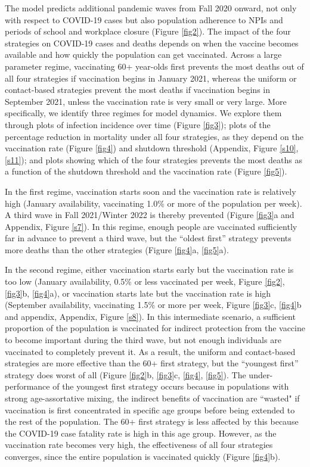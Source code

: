 The model predicts additional pandemic waves from Fall 2020 onward, not only with respect to COVID-19 cases but also population adherence to NPIs and periods of school and workplace closure (Figure \ref{fig2}). The impact of the four strategies on COVID-19 cases and deaths depends on when the vaccine becomes available and how quickly the population can get vaccinated. Across a large parameter regime, vaccinating 60+ year-olds first prevents the most deaths out of all four strategies if vaccination begins in January 2021, whereas the uniform or contact-based strategies prevent the most deaths if vaccination begins in September 2021, unless the vaccination rate is very small or very large. More specifically, we identify three regimes for model dynamics. We explore them through plots of infection incidence over time (Figure \ref{fig3}); plots of the percentage reduction in mortality under all four strategies, as they depend on the vaccination rate (Figure \ref{fig4}) and shutdown threshold (Appendix, Figure \ref{s10}, \ref{s11}); and plots showing which of the four strategies prevents the most deaths as a function of the shutdown threshold and the vaccination rate (Figure \ref{fig5}). 

In the first regime, vaccination starts soon and the vaccination rate is relatively high (January availability, vaccinating 1.0\% or more of the population per week). A third wave in Fall 2021/Winter 2022 is thereby prevented (Figure \ref{fig3}a and Appendix, Figure \ref{s7}).  In this regime, enough people are vaccinated sufficiently far in advance to prevent a third wave, but the “oldest first” strategy prevents more deaths than the other strategies (Figure \ref{fig4}a, \ref{fig5}a). 

In the second regime, either vaccination starts early but the vaccination rate is too low (January availability, 0.5\% or less vaccinated per week, Figure \ref{fig2}, \ref{fig3}b, \ref{fig4}a), or vaccination starts late but the vaccination rate is high (September availability, vaccinating 1.5\% or more per week, Figure \ref{fig3}c, \ref{fig4}b and appendix, Appendix, Figure \ref{s8}).  In this intermediate scenario, a sufficient proportion of the population is vaccinated for indirect protection from the vaccine to become important during the third wave, but not enough individuals are vaccinated to completely prevent it.  As a result, the uniform and contact-based strategies are more effective than the 60+ first strategy, but the “youngest first” strategy does worst of all (Figure \ref{fig2}b, \ref{fig3}c, \ref{fig4}, \ref{fig5}).  The under-performance of the youngest first strategy occurs because in populations with strong age-assortative mixing, the indirect benefits of vaccination are “wasted" if vaccination is first concentrated in specific age groups before being extended to the rest of the population.  The 60+ first strategy is less affected by this because the COVID-19 case fatality rate is high in this age group. However, as the vaccination rate becomes very high, the effectiveness of all four strategies converges, since the entire population is vaccinated quickly (Figure \ref{fig4}b).

